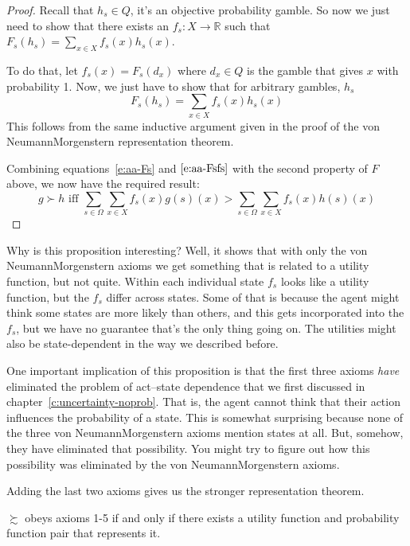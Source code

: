 \begin{proof}
Recall that $h_s \in Q$, it's an objective probability gamble. So now we just need to show that there exists an $f_s: X \to \mathbb{R}$ such that $F_s(h_s) = \sum_{x\in X} f_s(x)h_s(x)$.

To do that, let $f_s(x) = F_s(d_x)$ where $d_x \in Q$ is the gamble that gives $x$ with probability 1.  Now, we just have to show that for arbitrary gambles, $h_s$
\begin{equation}
    \label{e:aa-Fsfs}
    F_s(h_s) = \sum_{x\in X} f_s(x)h_s(x) 
\end{equation}
This  follows from the same inductive argument given in the proof of the von Neumann\breakslash Morgenstern representation theorem.

Combining equations~\ref{e:aa-Fs} and $\ref{e:aa-Fsfs}$ with the second property of $F$ above, we now have the required result:
 \begin{equation*}
    g \succ h \text{ iff } \sum_{s \in \Omega} \sum_{x \in X} f_s(x) g(s)(x) > \sum_{s \in \Omega} \sum_{x \in X} f_s(x) h(s)(x)
\end{equation*}
\end{proof}

Why is this proposition interesting? Well, it shows that with only the von Neumann\breakslash Morgenstern axioms we get something that is related to a utility function, but not quite.  Within each individual state $f_s$ looks like a utility function, but the $f_s$ differ across states. Some of that is because the agent might think some states are more likely than others, and this gets incorporated into the $f_s$, but we have no guarantee that's the only thing going on.  The utilities might also be state-dependent in the way we described before.

One important implication of this proposition is that the first three axioms {\it have} eliminated the problem of act--state dependence that we first discussed in chapter~\ref{c:uncertainty-noprob}.  That is, the agent cannot think that their action influences the probability of a state.  This is somewhat surprising because none of the three von Neumann\breakslash Morgenstern axioms mention states at all. But, somehow, they have eliminated that possibility. You might try to figure out how this possibility was eliminated by the von Neumann\breakslash Morgenstern axioms.

Adding the last two axioms gives us the stronger representation theorem.

\begin{proposition}
    $\succsim$ obeys axioms 1-5 if and only if there exists a utility function and probability function pair that represents it.
\end{proposition}

